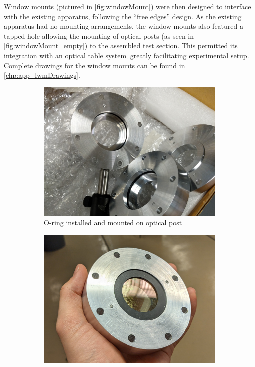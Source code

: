             Window mounts (pictured in \autoref{fig:windowMount}) were then designed to interface with the existing apparatus, following the ``free edges'' design. As the existing apparatus had no mounting arrangements, the window mounts also featured a tapped hole allowing the mounting of optical posts (as seen in \autoref{fig:windowMount_empty}) to the assembled test section. This permitted its integration with an optical table system, greatly facilitating experimental setup. Complete drawings for the window mounts can be found in \autoref{chp:app_lwmDrawings}.

            \begin{figure}[h]
                \centering
                \begin{subfigure}[t]{0.48\textwidth}
                    \centering
                    \includegraphics[width=\textwidth]{assets/3 design/windowMount_empty.jpg}
                    \caption{O-ring installed and mounted on optical post}
                    \label{fig:windowMount_empty}
                \end{subfigure}
                \begin{subfigure}[t]{0.48\textwidth}
                    \centering
                    \includegraphics[width=\textwidth]{assets/3 design/windowMount_installed.jpg}

\end{subfigure}
\end{figure}

